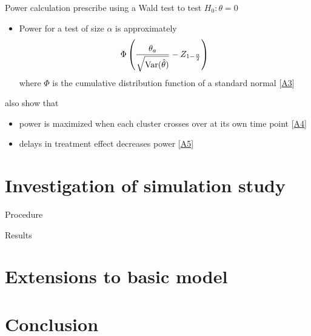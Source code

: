 \documentclass[9pt]{beamer}
\begin{document}
\begin{frame}{Power calculation} \label{slide:power}
\citet{Hussey:2007} prescribe using a Wald test to test $H_0:\theta=0$
\begin{itemize}
\item
Power for a test of size $\alpha$ is approximately
\[
\Phi\left(\frac{\theta_a}{\sqrt{\mathrm{Var}(\hat{\theta})}} - Z_{1-\frac{\alpha}{2}}\right)
\]
where $\Phi$ is the cumulative distribution function of a standard normal [\hyperlink{apx:power}{A3}]
\end{itemize}
\vspace{2em}

\citet{Hussey:2007} also show that
\begin{itemize}

\item
power is maximized when each cluster crosses over at its own time point [\hyperlink{apx:timepoints}{A4}]

\item
delays in treatment effect decreases power [\hyperlink{apx:delay}{A5}]

\end{itemize}
\end{frame}



\section{Investigation of simulation study}



\begin{frame}{Procedure}
\end{frame}



\begin{frame}{Results}
\end{frame}



\section{Extensions to basic model}



\section{Conclusion}
\end{document}
